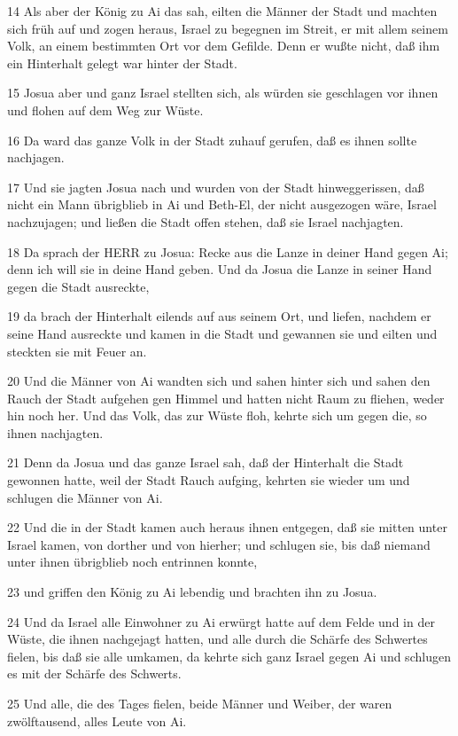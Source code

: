 \par 14 Als aber der König zu Ai das sah, eilten die Männer der Stadt und machten sich früh auf und zogen heraus, Israel zu begegnen im Streit, er mit allem seinem Volk, an einem bestimmten Ort vor dem Gefilde. Denn er wußte nicht, daß ihm ein Hinterhalt gelegt war hinter der Stadt.
\par 15 Josua aber und ganz Israel stellten sich, als würden sie geschlagen vor ihnen und flohen auf dem Weg zur Wüste.
\par 16 Da ward das ganze Volk in der Stadt zuhauf gerufen, daß es ihnen sollte nachjagen.
\par 17 Und sie jagten Josua nach und wurden von der Stadt hinweggerissen, daß nicht ein Mann übrigblieb in Ai und Beth-El, der nicht ausgezogen wäre, Israel nachzujagen; und ließen die Stadt offen stehen, daß sie Israel nachjagten.
\par 18 Da sprach der HERR zu Josua: Recke aus die Lanze in deiner Hand gegen Ai; denn ich will sie in deine Hand geben. Und da Josua die Lanze in seiner Hand gegen die Stadt ausreckte,
\par 19 da brach der Hinterhalt eilends auf aus seinem Ort, und liefen, nachdem er seine Hand ausreckte und kamen in die Stadt und gewannen sie und eilten und steckten sie mit Feuer an.
\par 20 Und die Männer von Ai wandten sich und sahen hinter sich und sahen den Rauch der Stadt aufgehen gen Himmel und hatten nicht Raum zu fliehen, weder hin noch her. Und das Volk, das zur Wüste floh, kehrte sich um gegen die, so ihnen nachjagten.
\par 21 Denn da Josua und das ganze Israel sah, daß der Hinterhalt die Stadt gewonnen hatte, weil der Stadt Rauch aufging, kehrten sie wieder um und schlugen die Männer von Ai.
\par 22 Und die in der Stadt kamen auch heraus ihnen entgegen, daß sie mitten unter Israel kamen, von dorther und von hierher; und schlugen sie, bis daß niemand unter ihnen übrigblieb noch entrinnen konnte,
\par 23 und griffen den König zu Ai lebendig und brachten ihn zu Josua.
\par 24 Und da Israel alle Einwohner zu Ai erwürgt hatte auf dem Felde und in der Wüste, die ihnen nachgejagt hatten, und alle durch die Schärfe des Schwertes fielen, bis daß sie alle umkamen, da kehrte sich ganz Israel gegen Ai und schlugen es mit der Schärfe des Schwerts.
\par 25 Und alle, die des Tages fielen, beide Männer und Weiber, der waren zwölftausend, alles Leute von Ai.
